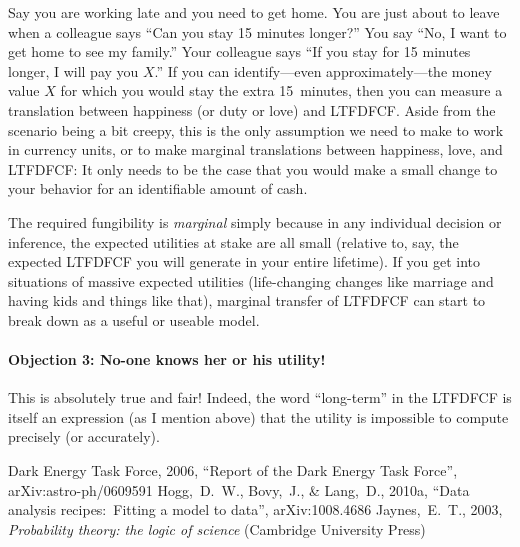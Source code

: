 \documentclass[12pt,twoside,pdftex]{article}
\begin{document}
Say you are working late and you need to get home.  You are just about
to leave when a colleague says ``Can you stay 15 minutes longer?''
You say ``No, I want to get home to see my family.''  Your colleague
says ``If you stay for 15 minutes longer, I will pay you $X$.''  If
you can identify---even approximately---the money value $X$ for which
you would stay the extra 15~minutes, then you can measure a
translation between happiness (or duty or love) and LTFDFCF.  Aside
from the scenario being a bit creepy, this is the only assumption we
need to make to work in currency units, or to make marginal
translations between happiness, love, and LTFDFCF: It only needs to be
the case that you would make a small change to your behavior for an
identifiable amount of cash.

The required fungibility is \emph{marginal} simply because in any
individual decision or inference, the expected utilities at stake are
all small (relative to, say, the expected LTFDFCF you will generate in
your entire lifetime).  If you get into situations of massive expected
utilities (life-changing changes like marriage and having kids and
things like that), marginal transfer of LTFDFCF can start to break
down as a useful or useable model.

\paragraph{Objection 3: No-one knows her or his utility!}
This is absolutely true and fair!  Indeed, the word ``long-term'' in
the LTFDFCF is itself an expression (as I mention above) that the
utility is impossible to compute precisely (or accurately).

\clearpage
{}\theendnotes

\clearpage
\begin{thebibliography}{}\raggedright
{}
  Dark Energy Task Force, 2006,
  ``Report of the Dark Energy Task Force'', arXiv:astro-ph/0609591
  Hogg,~D.~W., Bovy,~J., \& Lang,~D., 2010a,
  ``Data analysis recipes:\ Fitting a model to data'', arXiv:1008.4686
  Jaynes,~E.~T., 2003,
  \textit{Probability theory: the logic of science} (Cambridge University Press)
\end{thebibliography}
\end{document}
